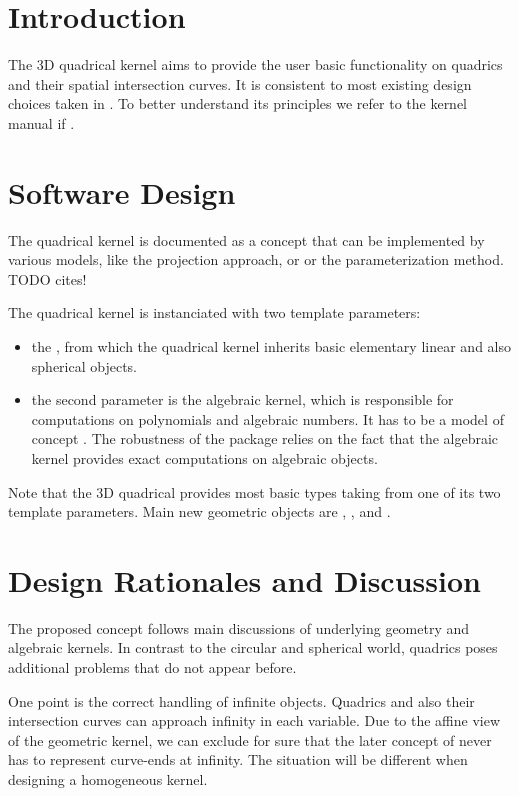 
\section{Introduction}

The 3D quadrical kernel aims to provide the user basic functionality
on quadrics and their spatial intersection curves. It is 
consistent to most existing design choices taken in \cgal. To better
understand its principles we refer to the kernel manual if \cgal.

\section{Software Design}

The quadrical kernel is documented as a concept that can be 
implemented by various models, like the projection approach, or
or the parameterization method. TODO cites!

The quadrical kernel is instanciated with two template parameters:
\begin{itemize}
\item {} the , from which the quadrical
kernel inherits basic elementary linear and also
spherical objects.
\item {} the second parameter is the algebraic kernel, which is 
responsible for computations on polynomials and algebraic numbers. It 
has to be a model of concept . The
robustness of the package relies on the fact that the algebraic kernel
provides exact computations on algebraic objects.
\end{itemize}

Note that the 3D quadrical provides most basic types taking from one
of its two template parameters. Main new geometric objects
are , ,  and .

\section{Design Rationales and Discussion}

The proposed concept follows main discussions of underlying
geometry and algebraic kernels. In contrast to the circular
and spherical world, quadrics poses additional problems that do 
not appear before. 

One point is the correct handling of infinite objects. Quadrics
and also their intersection curves can approach infinity in each variable.
Due to the affine view of the geometric kernel, we can exclude
for sure that the later concept of  never has 
to represent curve-ends at infinity. The situation will be different
when designing a homogeneous kernel. 

